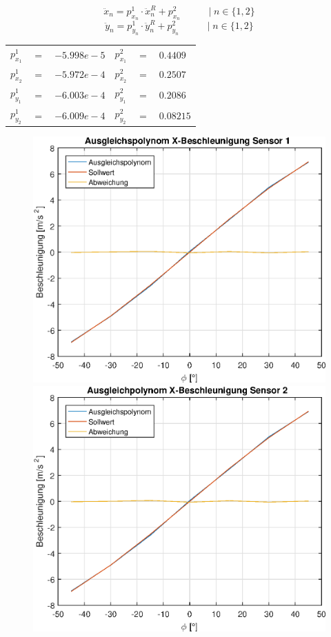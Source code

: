\vspace*{-\baselineskip}
\begin{equation}
\ddot{x}_n = p^1_{x_n} \cdot \ddot{x}^R_n + p^2_{x_n} \hspace{35pt} \vert \hspace{3pt} n \in \{1, 2\}
\end{equation}
\begin{equation}
\ddot{y}_n = p^1_{y_n} \cdot \ddot{y}^R_n + p^2_{y_n} \hspace{35pt} \vert \hspace{3pt} n \in \{1, 2\}
\end{equation}
\vspace*{-\baselineskip}
\begin{table}[h]
\centering
\begin{tabular}{lcllcl}
$p^1_{x_1}$ &$=$& $-5.998e-5$ & $p^2_{x_1}$ &$=$& $0.4409$ \\
$p^1_{x_2}$ &$=$& $-5.972e-4$ & $p^2_{x_2}$ &$=$& $0.2507$ \\
$p^1_{y_1}$ &$=$& $-6.003e-4$ & $p^2_{y_1}$ &$=$& $0.2086$ \\
$p^1_{y_2}$ &$=$& $-6.009e-4$ & $p^2_{y_2}$ &$=$& $0.08215$ \\
\end{tabular}
\end{table}

\vspace*{-\baselineskip}
\begin{figure}[h]
	\includegraphics[width=0.5\linewidth]{img/X1__dd___fitted.eps}
	\includegraphics[width=0.5\linewidth]{img/X2__dd___fitted.eps}
\end{figure}

